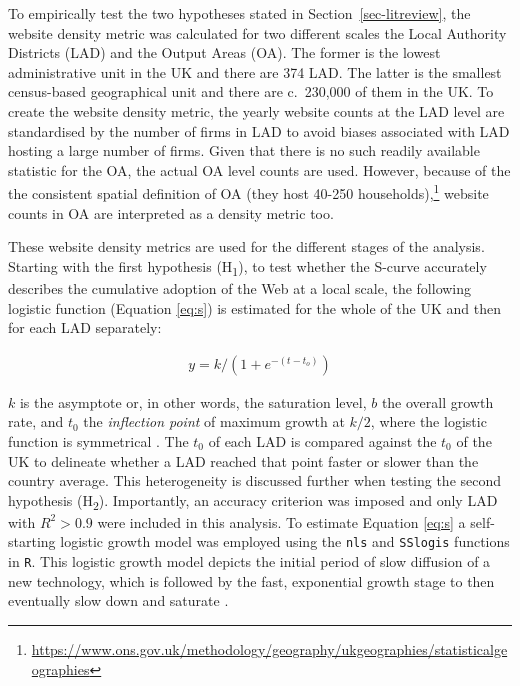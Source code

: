 \documentclass[
  authoryear,
  preprint,
  3p]{elsarticle}
\begin{document}
To empirically test the two hypotheses stated in
Section~\ref{sec-litreview}, the website density metric was calculated
for two different scales the Local Authority Districts (LAD) and the
Output Areas (OA). The former is the lowest administrative unit in the
UK and there are 374 LAD. The latter is the smallest census-based
geographical unit and there are c.~230,000 of them in the UK. To create
the website density metric, the yearly website counts at the LAD level
are standardised by the number of firms in LAD to avoid biases
associated with LAD hosting a large number of firms. Given that there is
no such readily available statistic for the OA, the actual OA level
counts are used. However, because of the the consistent spatial
definition of OA (they host 40-250 households),\footnote{\url{https://www.ons.gov.uk/methodology/geography/ukgeographies/statisticalgeographies}}
website counts in OA are interpreted as a density metric too.

These website density metrics are used for the different stages of the
analysis. Starting with the first hypothesis (H\textsubscript{1}), to
test whether the S-curve accurately describes the cumulative adoption of
the Web at a local scale, the following logistic function (Equation
\ref{eq:s}) is estimated for the whole of the UK and then for each LAD
separately:

\begin{align}
y = k /(1 + e^{-(t-t_{o})})\label{eq:s}
\end{align}

\noindent \(k\) is the asymptote or, in other words, the saturation
level, \(b\) the overall growth rate, and \(t_{0}\) the \emph{inflection
point} of maximum growth at \(k/2\), where the logistic function is
symmetrical \citep{wilson201281}. The \(t_0\) of each LAD is compared
against the \(t_0\) of the UK to delineate whether a LAD reached that
point faster or slower than the country average. This heterogeneity is
discussed further when testing the second hypothesis
(H\textsubscript{2}). Importantly, an accuracy criterion was imposed and
only LAD with \(R^2 > 0.9\) were included in this analysis. To estimate
Equation \ref{eq:s} a self-starting logistic growth model was employed
using the \texttt{nls} and \texttt{SSlogis} functions in \texttt{R}.
This logistic growth model depicts the initial period of slow diffusion
of a new technology, which is followed by the fast, exponential growth
stage to then eventually slow down and saturate
\citep{wilson201281, grubler1999dynamics}.
\end{document}
